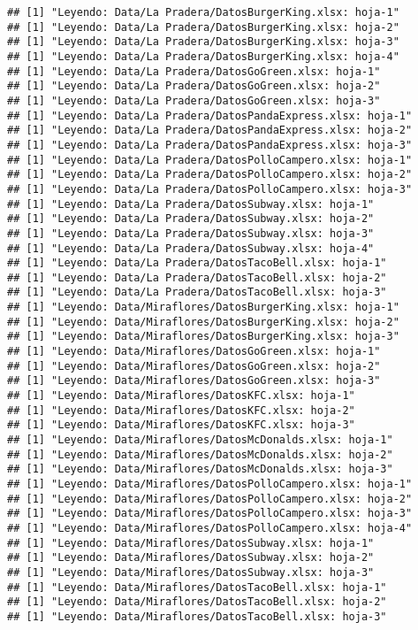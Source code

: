 \documentclass[]{article}
\begin{document}
\begin{verbatim}
## [1] "Leyendo: Data/La Pradera/DatosBurgerKing.xlsx: hoja-1"
## [1] "Leyendo: Data/La Pradera/DatosBurgerKing.xlsx: hoja-2"
## [1] "Leyendo: Data/La Pradera/DatosBurgerKing.xlsx: hoja-3"
## [1] "Leyendo: Data/La Pradera/DatosBurgerKing.xlsx: hoja-4"
## [1] "Leyendo: Data/La Pradera/DatosGoGreen.xlsx: hoja-1"
## [1] "Leyendo: Data/La Pradera/DatosGoGreen.xlsx: hoja-2"
## [1] "Leyendo: Data/La Pradera/DatosGoGreen.xlsx: hoja-3"
## [1] "Leyendo: Data/La Pradera/DatosPandaExpress.xlsx: hoja-1"
## [1] "Leyendo: Data/La Pradera/DatosPandaExpress.xlsx: hoja-2"
## [1] "Leyendo: Data/La Pradera/DatosPandaExpress.xlsx: hoja-3"
## [1] "Leyendo: Data/La Pradera/DatosPolloCampero.xlsx: hoja-1"
## [1] "Leyendo: Data/La Pradera/DatosPolloCampero.xlsx: hoja-2"
## [1] "Leyendo: Data/La Pradera/DatosPolloCampero.xlsx: hoja-3"
## [1] "Leyendo: Data/La Pradera/DatosSubway.xlsx: hoja-1"
## [1] "Leyendo: Data/La Pradera/DatosSubway.xlsx: hoja-2"
## [1] "Leyendo: Data/La Pradera/DatosSubway.xlsx: hoja-3"
## [1] "Leyendo: Data/La Pradera/DatosSubway.xlsx: hoja-4"
## [1] "Leyendo: Data/La Pradera/DatosTacoBell.xlsx: hoja-1"
## [1] "Leyendo: Data/La Pradera/DatosTacoBell.xlsx: hoja-2"
## [1] "Leyendo: Data/La Pradera/DatosTacoBell.xlsx: hoja-3"
## [1] "Leyendo: Data/Miraflores/DatosBurgerKing.xlsx: hoja-1"
## [1] "Leyendo: Data/Miraflores/DatosBurgerKing.xlsx: hoja-2"
## [1] "Leyendo: Data/Miraflores/DatosBurgerKing.xlsx: hoja-3"
## [1] "Leyendo: Data/Miraflores/DatosGoGreen.xlsx: hoja-1"
## [1] "Leyendo: Data/Miraflores/DatosGoGreen.xlsx: hoja-2"
## [1] "Leyendo: Data/Miraflores/DatosGoGreen.xlsx: hoja-3"
## [1] "Leyendo: Data/Miraflores/DatosKFC.xlsx: hoja-1"
## [1] "Leyendo: Data/Miraflores/DatosKFC.xlsx: hoja-2"
## [1] "Leyendo: Data/Miraflores/DatosKFC.xlsx: hoja-3"
## [1] "Leyendo: Data/Miraflores/DatosMcDonalds.xlsx: hoja-1"
## [1] "Leyendo: Data/Miraflores/DatosMcDonalds.xlsx: hoja-2"
## [1] "Leyendo: Data/Miraflores/DatosMcDonalds.xlsx: hoja-3"
## [1] "Leyendo: Data/Miraflores/DatosPolloCampero.xlsx: hoja-1"
## [1] "Leyendo: Data/Miraflores/DatosPolloCampero.xlsx: hoja-2"
## [1] "Leyendo: Data/Miraflores/DatosPolloCampero.xlsx: hoja-3"
## [1] "Leyendo: Data/Miraflores/DatosPolloCampero.xlsx: hoja-4"
## [1] "Leyendo: Data/Miraflores/DatosSubway.xlsx: hoja-1"
## [1] "Leyendo: Data/Miraflores/DatosSubway.xlsx: hoja-2"
## [1] "Leyendo: Data/Miraflores/DatosSubway.xlsx: hoja-3"
## [1] "Leyendo: Data/Miraflores/DatosTacoBell.xlsx: hoja-1"
## [1] "Leyendo: Data/Miraflores/DatosTacoBell.xlsx: hoja-2"
## [1] "Leyendo: Data/Miraflores/DatosTacoBell.xlsx: hoja-3"

\end{verbatim}
\end{document}
